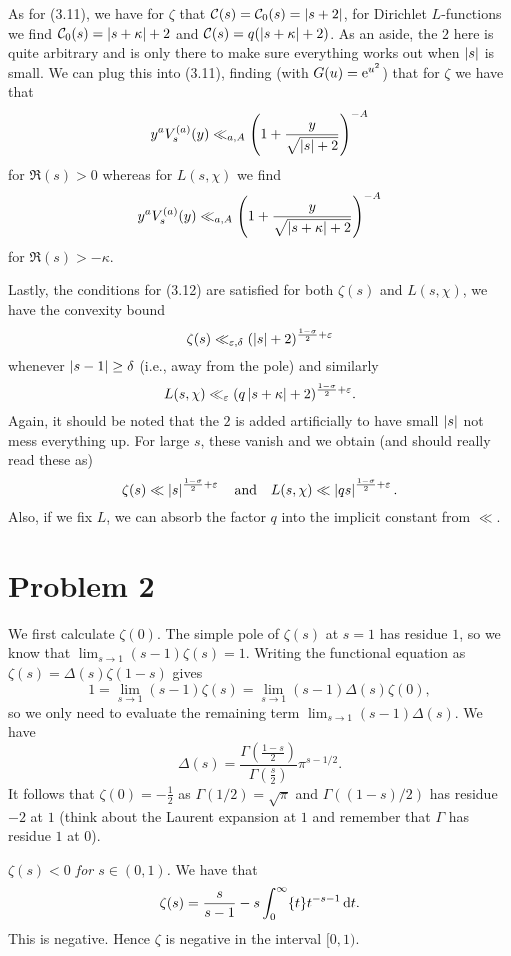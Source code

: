 \documentclass[a4paper,11pt]{article}
\begin{document}
As for (3.11), we have for $\zeta$ that $\mathcal C(s) = \mathcal{C}_0(s) = \left\lvert s+2 \right\rvert$, 
for Dirichlet $L$-functions we find $\mathcal{C}_0(s) = \left\lvert s + \kappa \right\rvert + 2$ and
$\mathcal{C}(s) = q(\left\lvert s + \kappa \right\rvert + 2)$. As an aside, the $2$ here is quite arbitrary 
and is only there to make sure everything works out when $\left\lvert s \right\rvert$ is small. 
We can plug this into (3.11), finding (with $G(u) = \mathrm e^{u^2}$) that for $\zeta$
we have that
\[
    y^aV_s^{(a)}(y) \ll_{a,A} \left(1 + \frac{y}{\sqrt{\left\lvert s \right\rvert +2}} \right)^{-A}
\]
for $\Re(s) > 0$ whereas for $L(s, \chi)$ we find
\[
    y^aV_s^{(a)}(y) \ll_{a,A} \left(1 + \frac{y}{\sqrt{\left\lvert s+\kappa \right\rvert +2}}
    \right)^{-A}
\]
for $\Re(s) > -\kappa$. 

Lastly, the conditions for (3.12) are satisfied for both $\zeta(s)$ and $L(s,\chi)$, 
we have the convexity bound
\[
    \zeta(s) \ll_{\varepsilon, \delta} (\left\lvert s \right\rvert + 2)^{\frac{1-\sigma}2+\varepsilon}
\]
whenever $\left\lvert s-1 \right\rvert \geq \delta$ (i.e., away from the pole) and similarly
\[
    L(s,\chi) \ll_\varepsilon (q\left\lvert s+\kappa \right\rvert+2)^{\frac{1-\sigma}2 + \varepsilon}. 
\]
Again, it should be noted that the $2$ is added artificially to have 
small $\left\lvert s \right\rvert$ not mess everything up. For large $s$, these vanish and we obtain 
(and should really read these as)
\[
    \zeta(s) \ll \left\lvert s \right\rvert ^{\frac{1-\sigma}2+\varepsilon} \quad \text{and}
    \quad  L(s, \chi) \ll \left\lvert qs \right\rvert^{\frac{1-\sigma}2 + \varepsilon}. 
\]
Also, if we fix $L$, we can absorb the factor $q$ into the implicit constant 
from $\ll$. 



\section*{Problem 2}
We first calculate $\zeta(0)$. The simple pole of $\zeta(s)$ at $s=1$ has
residue $1$, so we know that 
$\lim_{s \to 1} (s-1) \zeta(s) = 1$. Writing the functional equation as
$\zeta(s) = \Delta(s) \zeta(1-s)$ 
gives 
\[
    1 = \lim_{s \to 1} (s-1) \zeta(s) = \lim_{s \to 1} (s-1) \Delta(s) \zeta(0),
\]
so we only need to evaluate the remaining term $\lim_{s \to 1}(s-1) \Delta(s)$.
We have 
$$\Delta(s) = \frac{\Gamma(\frac{1-s}2)}{\Gamma(\frac s2)} \pi^{s-1/2}.$$
It follows that $\zeta(0) = -\frac 12$ as $\Gamma(1/2) = \sqrt \pi$ and 
$\Gamma((1-s)/2)$ has residue $-2$ at $1$ (think about the Laurent expansion at $1$
and remember that $\Gamma$ has residue $1$ at $0$). 

\textit{$\zeta(s) < 0$ for $s \in (0,1)$.} We have that 
\[
    \zeta(s) = \frac{s}{s-1} - s \int_0^\infty \{t\} t^{-s-1} \mathrm{\,d} t.
\]
This is negative. Hence $\zeta$ is negative in the interval $[0,1)$. 
\end{document}

